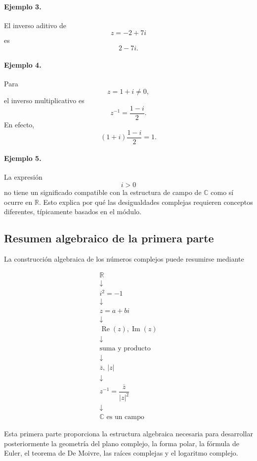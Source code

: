 \paragraph{Ejemplo 3.}
El inverso aditivo de
\[
z=-2+7i
\]
es
\[
2-7i.
\]

\paragraph{Ejemplo 4.}
Para
\[
z=1+i\neq0,
\]
el inverso multiplicativo es
\[
z^{-1}
=
\frac{1-i}{2}.
\]
En efecto,
\[
(1+i)\frac{1-i}{2}
=
1.
\]

\paragraph{Ejemplo 5.}
La expresión
\[
i>0
\]
no tiene un significado compatible con la estructura de campo de
$\mathbb{C}$ como sí ocurre en $\mathbb{R}$. Esto explica por qué las
desigualdades complejas requieren conceptos diferentes, típicamente
basados en el módulo.

\subsection{Resumen algebraico de la primera parte}

La construcción algebraica de los números complejos puede resumirse mediante

\[
\boxed{
\begin{array}{c}
\mathbb{R}
\\[0.2cm]
\downarrow
\\[0.2cm]
i^2=-1
\\[0.2cm]
\downarrow
\\[0.2cm]
z=a+bi
\\[0.2cm]
\downarrow
\\[0.2cm]
\operatorname{Re}(z),\operatorname{Im}(z)
\\[0.2cm]
\downarrow
\\[0.2cm]
\text{suma y producto}
\\[0.2cm]
\downarrow
\\[0.2cm]
\overline z,\ |z|
\\[0.2cm]
\downarrow
\\[0.2cm]
z^{-1}=\dfrac{\overline z}{|z|^2}
\\[0.2cm]
\downarrow
\\[0.2cm]
\mathbb{C}\text{ es un campo}
\end{array}
}
\]

Esta primera parte proporciona la estructura algebraica necesaria para
desarrollar posteriormente la geometría del plano complejo, la forma polar,
la fórmula de Euler, el teorema de De Moivre, las raíces complejas y el
logaritmo complejo.
